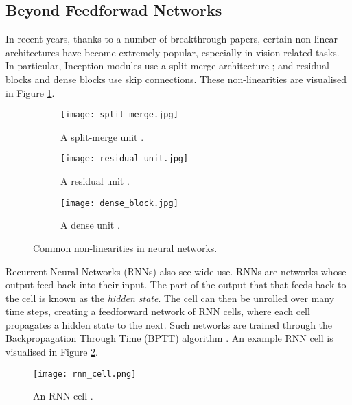 \subsection{Beyond Feedforwad Networks} \label{sec:2-bg-beyond-ff}
In recent years, thanks to a number of breakthrough papers, certain non-linear architectures have become extremely popular, especially in vision-related tasks.
In particular, Inception modules use a split-merge architecture \cite{Szegedy2015-inception, Szegedy2016-inception-res}; and residual blocks \cite{He2016-resnet, Xie2017-resnext, Szegedy2016-inception-res} and dense blocks \cite{Huang2017-densenet} use skip connections.
These non-linearities are visualised in Figure \ref{fig:2-non-linearities}.
\begin{figure}[hbtp]
    \centering
    \hspace{0.2cm}
    \begin{subfigure}[]{0.33\textwidth}
        \centering
        \texttt{[image: split-merge.jpg]}
        \caption{A split-merge unit \cite{Szegedy2015-inception, Szegedy2016-inception-res}.}
    \end{subfigure}%
    \hfill
    \begin{subfigure}[]{0.30\textwidth}
        \centering
        \texttt{[image: residual\_unit.jpg]}
        \caption{A residual unit \cite{He2016-resnet, Xie2017-resnext, Szegedy2016-inception-res}.}
    \end{subfigure}%
    \hfill
    \begin{subfigure}[]{0.33\textwidth}
        \centering
        \texttt{[image: dense\_block.jpg]}
        \caption{A dense unit \cite{Huang2017-densenet}.}
    \end{subfigure}%
    \hspace{0.2cm}
    \caption{Common non-linearities in neural networks.}
    \label{fig:2-non-linearities}
\end{figure}

Recurrent Neural Networks (RNNs) also see wide use.
RNNs are networks whose output feed back into their input.
The part of the output that that feeds back to the cell is known as the \textit{hidden state}.
The cell can then be unrolled over many time steps, creating a feedforward network of RNN cells, where each cell propagates a hidden state to the next.
Such networks are trained through the Backpropagation Through Time (BPTT) algorithm \cite{Robinson1987-rnn, Mozer1989-bptt, Werbos1990-bptt}.
An example RNN cell is visualised in Figure \ref{fig:2-rnn-cell}.
\begin{figure}[h]
    \centering
    \texttt{[image: rnn\_cell.png]}
    \caption{An RNN cell \cite[p.~22]{cs231n-rnns}.}
    \label{fig:2-rnn-cell}
\end{figure}

